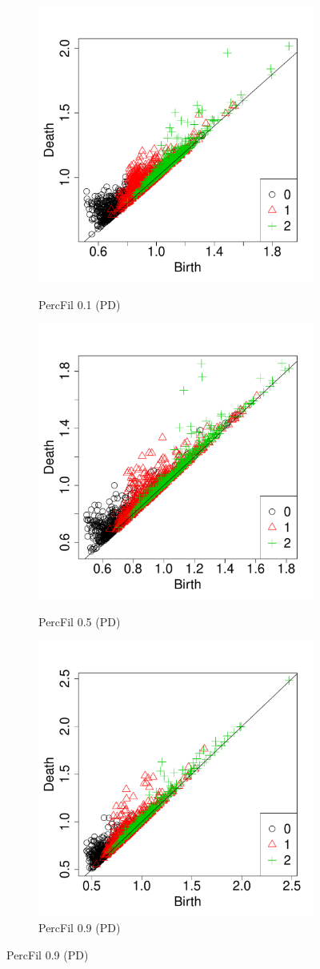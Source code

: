\documentclass[12pt]{article}
\begin{document}
\begin{center}
\begin{figure}[htp!]
\begin{subfigure}{.32\textwidth}
      \label{fig:percfil09voronoi}
    \end{subfigure}
      \begin{subfigure}{.32\textwidth}
      \centering
      \caption{PercFil 0.1 (PD)}  
      \includegraphics[width=0.6\linewidth]{figure_7_pd_0_1.pdf}
      \label{fig:percfil01pd}
    \end{subfigure}
      \begin{subfigure}{.32\textwidth}
      \centering
      \caption{PercFil 0.5 (PD)}  
      \includegraphics[width=0.6\linewidth]{figure_7_pd_0_5.pdf}
      \label{fig:percfil09pd}
    \end{subfigure}
      \begin{subfigure}{.32\textwidth}
      \centering
      \caption{PercFil 0.9 (PD)}  
      \includegraphics[width=0.6\linewidth]{figure_7_pd_0_9.pdf}

\end{subfigure}
\end{figure}
\end{center}
\end{document}
